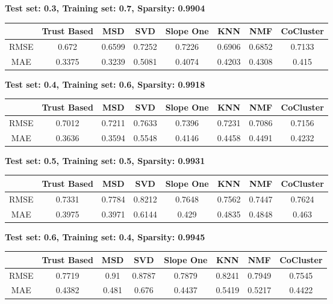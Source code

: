 	\textbf{Test set: 0.3, Training set: 0.7, Sparsity: 0.9904}
	\begin{center}
	\begin{tabular}{ | c | c | c | c | c | c | c | c |}
		\hline
		& Trust Based & MSD & SVD & Slope One & KNN & NMF & CoCluster\\ 
		\hline
		RMSE&0.672  & 0.6599  & 0.7252  & 0.7226  & 0.6906  & 0.6852  & 0.7133\\
		\hline
		MAE&0.3375  & 0.3239  & 0.5081  & 0.4074  & 0.4203  & 0.4308  & 0.415\\
		\hline
	\end{tabular}
	\end{center} 
	\vspace{1cm}
	\textbf{Test set: 0.4, Training set: 0.6, Sparsity: 0.9918}
	\begin{center}
	\begin{tabular}{ | c | c | c | c | c | c | c | c |}
		\hline
		& Trust Based & MSD & SVD & Slope One & KNN & NMF & CoCluster\\ 
		\hline
		RMSE&0.7012  & 0.7211  & 0.7633  & 0.7396  & 0.7231  & 0.7086  & 0.7156\\
		\hline
		MAE&0.3636  & 0.3594  & 0.5548  & 0.4146  & 0.4458  & 0.4491  & 0.4232\\
		\hline
	\end{tabular}
	\end{center} 
	\vspace{1cm}
	\textbf{Test set: 0.5, Training set: 0.5, Sparsity: 0.9931}
	\begin{center}
	\begin{tabular}{ | c | c | c | c | c | c | c | c |}
		\hline
		& Trust Based & MSD & SVD & Slope One & KNN & NMF & CoCluster\\ 
		\hline
		RMSE&0.7331  & 0.7784  & 0.8212  & 0.7648  & 0.7562  & 0.7447  & 0.7624\\
		\hline
		MAE&0.3975  & 0.3971  & 0.6144  & 0.429  & 0.4835  & 0.4848  & 0.463\\
		\hline
	\end{tabular}
	\end{center} 
	\vspace{1cm}
	\textbf{Test set: 0.6, Training set: 0.4, Sparsity: 0.9945}
	\begin{center}
	\begin{tabular}{ | c | c | c | c | c | c | c | c |}
		\hline
		& Trust Based & MSD & SVD & Slope One & KNN & NMF & CoCluster\\ 
		\hline
		RMSE&0.7719  & 0.91  & 0.8787  & 0.7879  & 0.8241  & 0.7949  & 0.7545\\
		\hline
		MAE&0.4382  & 0.481  & 0.676  & 0.4437  & 0.5419  & 0.5217  & 0.4422\\
		\hline
	\end{tabular}
	\end{center} 
